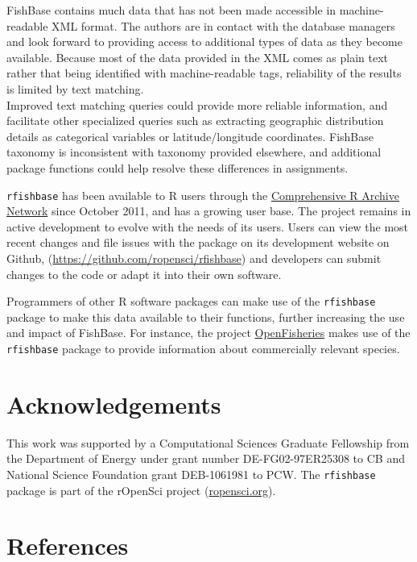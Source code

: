 \documentclass[author-year]{elsarticle} %
\begin{document}
FishBase contains much data that has not been made accessible in
machine-readable XML format. The authors are in contact with the
database managers and look forward to providing access to additional
types of data as they become available. Because most of the data
provided in the XML comes as plain text rather that being identified
with machine-readable tags, reliability of the results is limited by
text matching.\\Improved text matching queries could provide more
reliable information, and facilitate other specialized queries such as
extracting geographic distribution details as categorical variables or
latitude/longitude coordinates. FishBase taxonomy is inconsistent with
taxonomy provided elsewhere, and additional package functions could help
resolve these differences in assignments.

\texttt{rfishbase} has been available to R users through the
\href{http://cran.r-project.org/web/packages/rfishbase/}{Comprehensive R
Archive Network} since October 2011, and has a growing user base. The
project remains in active development to evolve with the needs of its
users. Users can view the most recent changes and file issues with the
package on its development website on Github,
(\href{https://github.com/ropensci/rfishbase}{https://github.com/ropensci/rfishbase})
and developers can submit changes to the code or adapt it into their own
software.

Programmers of other R software packages can make use of the
\texttt{rfishbase} package to make this data available to their
functions, further increasing the use and impact of FishBase. For
instance, the project \href{http://OpenFisheries.org}{OpenFisheries}
makes use of the \texttt{rfishbase} package to provide information about
commercially relevant species.

\section{Acknowledgements}

This work was supported by a Computational Sciences Graduate Fellowship
from the Department of Energy under grant number DE-FG02-97ER25308 to CB
and National Science Foundation grant DEB-1061981 to PCW. The
\texttt{rfishbase} package is part of the rOpenSci project
(\href{http://ropensci.org}{ropensci.org}).

\section{References}
\end{document}
